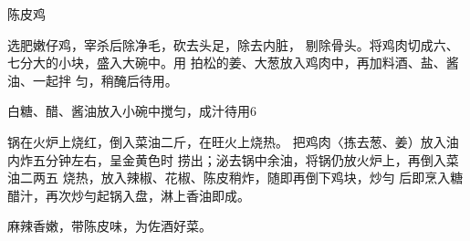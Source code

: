 \begin{recipe}{陈皮鸡}

\ingredients


\cooking

\step 选肥嫩仔鸡，宰杀后除净毛，砍去头足，除去内脏， 剔除骨头。将鸡肉切成六、七分大的小块，盛入大碗中。用 拍松的姜、大葱放入鸡肉中，再加料酒、盐、酱油、一起拌 匀，稍醃后待用。

\step 白糖、醋、酱油放入小碗中搅匀，成汁待用6

\step 锅在火炉上烧红，倒入菜油二斤，在旺火上烧热。 把鸡肉〈拣去葱、姜）放入油内炸五分钟左右，呈金黄色时 捞出；泌去锅中余油，将锅仍放火炉上，再倒入菜油二两五 烧热，放入辣椒、花椒、陈皮稍炸，随即再倒下鸡块，炒勻 后即烹入糖醋汁，再次炒勻起锅入盘，淋上香油即成。

\notes

麻辣香嫩，带陈皮味，为佐酒好菜。

\end{recipe}

